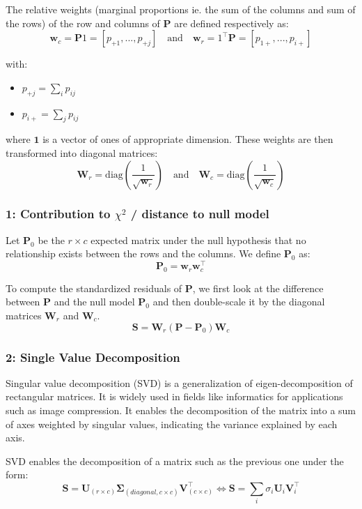 The relative weights (marginal proportions ie. the sum of the columns and sum of the rows) of the row and columns of $\mathbf{P}$ are defined respectively as: 
$$
    \mathbf{w}_c = \mathbf{P}1 = [p_{+1}, ... , p_{+j}] \quad \text{and} \quad \mathbf{w}_r = 1^\intercal\mathbf{P} = [p_{1+}, ... , p_{i+}]
$$

with:
\begin{itemize}
    \item $p_{+j} = \sum_ip_{ij}$
    \item $p_{i+} = \sum_jp_{ij}$
\end{itemize}

where \(\mathbf{1}\) is a vector of ones of appropriate dimension.
These weights are then transformed into diagonal matrices: 
$$
    \mathbf{W}_r = \text{diag}\left(\frac{1}{\sqrt{\mathbf{w}_r}}\right) \quad \text{and} \quad \mathbf{W}_c = \text{diag}\left(\frac{1}{\sqrt{\mathbf{w}_c}}\right)
$$

\subsubsection{1: Contribution to $\chi^2$ / distance to null model}

Let $\mathbf{P}_0$ be the $r\times c$ expected matrix under the null hypothesis that no relationship exists between the rows and the columns. We define $\mathbf{P}_0$ as:
$$
    \mathbf{P}_0 = \mathbf{w}_r \mathbf{w}_c^\intercal
$$

To compute the standardized residuals of $\mathbf{P}$, we first look at the difference between $\mathbf{P}$ and the null model $\mathbf{P}_0$ and then double-scale it by the diagonal matrices $\mathbf{W}_r$ and $\mathbf{W}_c$. 
$$
    \mathbf{S} = \mathbf{W}_r (\mathbf{P} - \mathbf{P}_0) \mathbf{W}_c
$$

\subsubsection{2: Single Value Decomposition}

Singular value decomposition (SVD) is a generalization of eigen-decomposition of rectangular matrices. It is widely used in fields like informatics for applications such as image compression. It enables the decomposition of the matrix into a sum of axes weighted by singular values, indicating the variance explained by each axis.

SVD enables the decomposition of a matrix such as the previous one under the form: 
$$
    \mathbf{S} = \mathbf{U}_{(r\times c)} \mathbf{\Sigma}_{(diagonal, c\times c)} \mathbf{V}_{(c \times c)}^\intercal \Leftrightarrow \mathbf{S} = \sum_i \sigma_i \mathbf{U}_i \mathbf{V}_i^\intercal
$$

